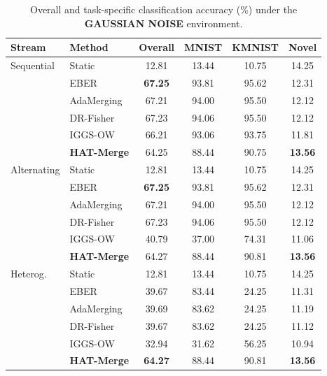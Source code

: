 \documentclass{article}
\theoremstyle{plain}
\theoremstyle{definition}
\theoremstyle{remark}
\begin{document}
\begin{table}[t]
\caption{Overall and task-specific classification accuracy (\%) under the \textbf{GAUSSIAN NOISE} environment.}
\label{tab:gaussian_results}
\vskip 0.15in
\begin{center}
\begin{footnotesize}
\begin{sc}
\setlength{\tabcolsep}{1.5pt}\begin{tabular}{@{}llcccc@{}}
\toprule
Stream & Method & Overall & MNIST & KMNIST & Novel \\
\midrule
Sequential & Static & 12.81 & 13.44 & 10.75 & 14.25 \\
& EBER & \textbf{67.25} & 93.81 & 95.62 & 12.31 \\
& AdaMerging & 67.21 & 94.00 & 95.50 & 12.12 \\
& DR-Fisher & 67.23 & 94.06 & 95.50 & 12.12 \\
& IGGS-OW & 66.21 & 93.06 & 93.75 & 11.81 \\
& \textbf{HAT-Merge} & 64.25 & 88.44 & 90.75 & \textbf{13.56} \\
\midrule
Alternating & Static & 12.81 & 13.44 & 10.75 & 14.25 \\
& EBER & \textbf{67.25} & 93.81 & 95.62 & 12.31 \\
& AdaMerging & 67.21 & 94.00 & 95.50 & 12.12 \\
& DR-Fisher & 67.23 & 94.06 & 95.50 & 12.12 \\
& IGGS-OW & 40.79 & 37.00 & 74.31 & 11.06 \\
& \textbf{HAT-Merge} & 64.27 & 88.44 & 90.81 & \textbf{13.56} \\
\midrule
Heterog. & Static & 12.81 & 13.44 & 10.75 & 14.25 \\
& EBER & 39.67 & 83.44 & 24.25 & 11.31 \\
& AdaMerging & 39.69 & 83.62 & 24.25 & 11.19 \\
& DR-Fisher & 39.67 & 83.62 & 24.25 & 11.12 \\
& IGGS-OW & 32.94 & 31.62 & 56.25 & 10.94 \\
& \textbf{HAT-Merge} & \textbf{64.27} & 88.44 & 90.81 & \textbf{13.56} \\
\bottomrule
\end{tabular}
\end{sc}
\end{footnotesize}
\end{center}
\vskip -0.1in
\end{table}
\end{document}
